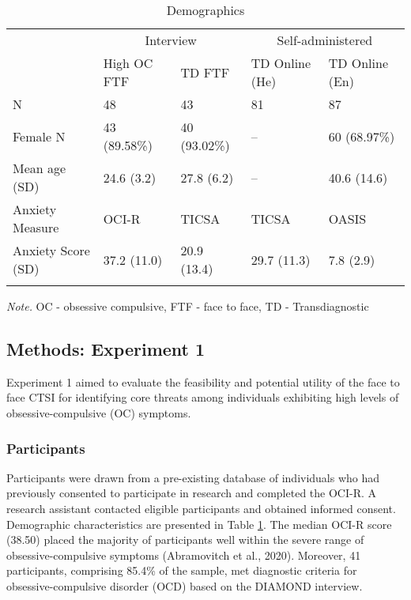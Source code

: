 \documentclass[
  man,floatsintext]{apa7}
\begin{document}
\begin{table}[tbp]

\begin{center}
\begin{threeparttable}

\caption{\label{tab:demographics}Demographics}

\begin{tabular}{lllll}
\toprule
 & \multicolumn{2}{c}{Interview} & \multicolumn{2}{c}{Self-administered} \\
\cmidrule(r){2-3} \cmidrule(r){4-5}
 & High OC FTF & TD FTF & TD Online (He) & TD Online (En)\\
\midrule
N & 48 & 43 & 81 & 87\\
Female N & 43 (89.58\%) & 40 (93.02\%) & -- & 60 (68.97\%)\\
Mean age (SD) & 24.6 (3.2) & 27.8 (6.2) & -- & 40.6 (14.6)\\
Anxiety Measure & OCI-R & TICSA & TICSA & OASIS\\
Anxiety Score (SD) & 37.2 (11.0) & 20.9 (13.4) & 29.7 (11.3) & 7.8 (2.9)\\
\bottomrule
\addlinespace
\end{tabular}

\begin{tablenotes}[para]
\normalsize{\textit{Note.} OC - obsessive compulsive, FTF - face to face, TD - Transdiagnostic}
\end{tablenotes}

\end{threeparttable}
\end{center}

\end{table}

\subsection{Methods: Experiment 1}\label{methods-experiment-1}

Experiment 1 aimed to evaluate the feasibility and potential utility of the face to face CTSI for identifying core threats among individuals exhibiting high levels of obsessive-compulsive (OC) symptoms.

\subsubsection{Participants}\label{participants}

Participants were drawn from a pre-existing database of individuals who had previously consented to participate in research and completed the OCI-R.
A research assistant contacted eligible participants and obtained informed consent.
Demographic characteristics are presented in Table \ref{tab:demographics}.
The median OCI-R score (38.50) placed the majority of participants well within the severe range of obsessive-compulsive symptoms (Abramovitch et al., 2020).
Moreover, 41 participants, comprising 85.4\% of the sample, met diagnostic criteria for obsessive-compulsive disorder (OCD) based on the DIAMOND interview.
\end{document}

